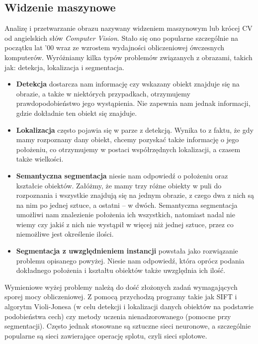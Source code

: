 \documentclass{article}
\begin{document}
\subsection*{\LARGE{Widzenie maszynowe}} 

Analizę i przetwarzanie obrazu nazywany widzeniem maszynowym lub krócej CV od angielskich słów \emph{Computer Vision}. Stało się ono popularne szczególnie na początku lat '00 wraz ze wzrostem wydajności obliczeniowej ówczesnych komputerów. Wyróżniamy kilka typów problemów związanych z obrazami, takich jak: detekcja, lokalizacja i segmentacja.

\begin{itemize}
\item \textbf{Detekcja} dostarcza nam informację czy wskazany obiekt znajduje się na obrazie,
a także w niektórych przypadkach, otrzymujemy prawdopodobieństwo jego wystąpienia. Nie zapewnia nam jednak informacji, gdzie dokładnie ten obiekt się znajduje.

\item \textbf{Lokalizacja} często pojawia się w parze z detekcją. Wynika to z faktu, że gdy mamy rozpoznany dany obiekt, chcemy pozyskać także informację o jego położeniu, co otrzymujemy w postaci współrzędnych lokalizacji, a czasem także wielkości.

\item \textbf{Semantyczna segmentacja} niesie nam odpowiedź o położeniu oraz kształcie obiektów. Załóżmy, że mamy trzy różne obiekty w puli do rozpoznania i wszystkie znajdują się na jednym obrazie, z czego dwa z nich są na nim po jednej sztuce, a ostatni – w dwóch. Semantyczna segmentacja umożliwi nam znalezienie położenia ich wszystkich, natomiast nadal nie wiemy czy jakiś z nich nie wystąpił w więcej niż jednej sztuce, przez co niemożliwe jest określenie ilości.

\item \textbf{Segmentacja z uwzględnieniem instancji} powstała jako rozwiązanie problemu opisanego powyżej. Niesie nam odpowiedź, która oprócz podania dokładnego położenia i kształtu obiektów także uwzględnia ich ilość.
\end{itemize} 

Wymieniowe wyżej problemy należą do dość złożonych zadań wymagających sporej mocy obliczeniowej. Z pomocą przychodzą programy takie jak SIFT i algorytm Violi-Jonesa (w celu detekcji i lokalizacji danych obiektów na podstawie podobieństwa cech) czy metody uczenia nienadzorowanego (pomocne przy segmentacji). Często jednak stosowane są sztuczne sieci neuronowe, a szczególnie popularne są sieci zawierające operację splotu, czyli sieci splotowe.
\end{document}
